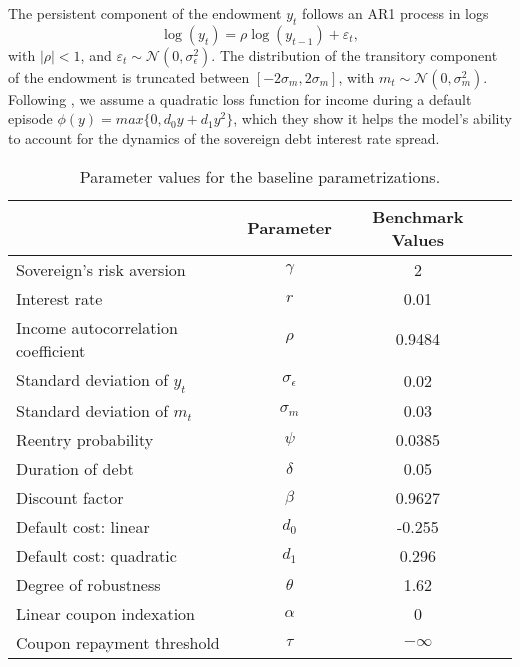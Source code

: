 The persistent component of the endowment $y_{t}$ follows an AR1 process in logs
\begin{equation*}
\log (y_{t})=\rho \log(y_{t-1})+\varepsilon _{t},
\end{equation*}
with $|\rho |<1$, and $\varepsilon _{t}\sim \mathcal{N}\left( 0,\sigma_{\epsilon }^{2}\right)$. The distribution of the transitory component of the endowment is truncated between $\left[-2 \sigma_{m},2 \sigma_{m}\right]$, with $m_{t}\sim \mathcal{N}\left( 0,\sigma_{m}^{2}\right)$. Following \cite{Chatty}, we assume a quadratic loss function for income during a default episode $\phi \left( y \right) = max \{ 0, d_0 y + d_1 y^2 \}$, which they show it helps the model's ability to account for the dynamics of the sovereign debt interest rate spread.

\begin{table}[!hbtp]\centering \small
\caption{Parameter values for the baseline parametrizations.}\label{Table_parameters}
\begin{tabular}{@{}lccc@{}} \toprule
 & \textbf{Parameter} &  \multicolumn{1}{G}{\textbf{Benchmark Values}} \\\midrule
Sovereign's risk aversion   & $\gamma$  & 2 \\
Interest rate & $r$   & 0.01 \\
Income autocorrelation coefficient & $\rho $  & 0.9484 \\
Standard deviation of $y_{t}$ & $\sigma_{\epsilon }$  & 0.02\\
Standard deviation of $m_{t}$ & $\sigma_{m}$  & 0.03\\
Reentry probability & $\psi $  & 0.0385 \\
Duration of debt & $\delta $  & 0.05 \\
Discount factor & $\beta$  & 0.9627 \\
Default cost: linear  & $d_0$   & -0.255 \\
Default cost: quadratic  & $d_1$    & 0.296 \\
Degree of robustness & $\theta$ & 1.62   \\
Linear coupon indexation & $\alpha$ & 0 \\
Coupon repayment threshold & $\tau$  & $-\infty$  \\
\bottomrule
\end{tabular}
\end{table}

